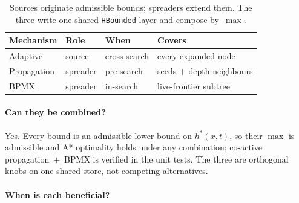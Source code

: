 \documentclass[11pt, a4paper]{article}
\begin{document}
\begin{table}[H]
\centering
\small
\begin{tabular}{@{}llll@{}}
\toprule
\textbf{Mechanism} & \textbf{Role} & \textbf{When} & \textbf{Covers} \\
\midrule
Adaptive    & source   & cross-search & every expanded node \\
Propagation & spreader & pre-search   & seeds $+$ depth-neighbours \\
BPMX        & spreader & in-search    & live-frontier subtree \\
\bottomrule
\end{tabular}
\caption{Sources originate admissible bounds; spreaders extend
them. The three write one shared \texttt{HBounded} layer and
compose by~$\max$.}
\end{table}

\paragraph{Can they be combined?}

Yes. Every bound is an admissible lower bound on $h^*(x, t)$, so
their $\max$ is admissible and A* optimality holds under any
combination; co-active propagation~$+$~BPMX is verified in the
unit tests. The three are orthogonal knobs on one shared store,
not competing alternatives.

\paragraph{When is each beneficial?}
\end{document}
